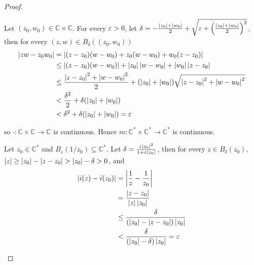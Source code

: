 \begin{proof}
\begin{enumerate}[label={(\alph*)}]
              Let $(z_{0}, w_{0})\in \mathbb{C}\times\mathbb{C}$. For every $\varepsilon > 0$, let $\delta = -\frac{\left\vert{z_{0}}\right\vert + \left\vert{w_{0}}\right\vert}{2} + \sqrt{\varepsilon + {\left(\frac{\left\vert{z_{0}}\right\vert + \left\vert{w_{0}}\right\vert}{2}\right)}^{2}}$, then for every $(z, w)\in B_{\delta}((z_{0}, w_{0}))$
              \begin{align*}
                  \left\vert{zw - z_{0}w_{0}}\right\vert & = \left\vert{(z - z_{0})(w - w_{0}) + z_{0}(w - w_{0}) + w_{0}(z - z_{0})}\right\vert                                                                   \\
                                        & \leq \left\vert{(z - z_{0})(w - w_{0})}\right\vert + \left\vert{z_{0}}\right\vert\left\vert{w - w_{0}}\right\vert + \left\vert{w_{0}}\right\vert\left\vert{z - z_{0}}\right\vert                                            \\
                                        & \leq \frac{\left\vert{z - z_{0}}\right\vert^{2} + \left\vert{w - w_{0}}\right\vert^{2}}{2} + (\left\vert{z_{0}}\right\vert + \left\vert{w_{0}}\right\vert)\sqrt{\left\vert{z - z_{0}}\right\vert^{2} + \left\vert{w - w_{0}}\right\vert^{2}} \\
                                        & < \frac{\delta^{2}}{2} + \delta(\left\vert{z_{0}}\right\vert + \left\vert{w_{0}}\right\vert)                                                                             \\
                                        & < \delta^{2} + \delta(\left\vert{z_{0}}\right\vert + \left\vert{w_{0}}\right\vert) = \varepsilon
              \end{align*}

              so $\cdot: \mathbb{C}\times\mathbb{C}\to\mathbb{C}$ is continuous. Hence $m: \mathbb{C}^{*}\times\mathbb{C}^{*}\to \mathbb{C}^{*}$ is continuous.

              Let $z_{0}\in\mathbb{C}^{*}$ and $B_{\varepsilon}(1/z_{0})\subseteq \mathbb{C}^{*}$. Let $\delta = \frac{\varepsilon\left\vert{z_{0}}\right\vert^{2}}{1 + \varepsilon\left\vert{z_{0}}\right\vert}$, then for every $z\in B_{\delta}(z_{0})$, $\left\vert{z}\right\vert\geq \left\vert{z_{0}}\right\vert - \left\vert{z - z_{0}}\right\vert > \left\vert{z_{0}}\right\vert - \delta > 0$, and
              \begin{align*}
                  \left\vert{i(z) - i(z_{0})}\right\vert & = \left\vert{\frac{1}{z} - \frac{1}{z_{0}}}\right\vert                            \\
                                        & = \frac{\left\vert{z - z_{0}}\right\vert}{\left\vert{z}\right\vert\left\vert{z_{0}}\right\vert}                     \\
                                        & \leq \frac{\delta}{(\left\vert{z_{0}}\right\vert - \left\vert{z - z_{0}}\right\vert)\left\vert{z_{0}}\right\vert}   \\
                                        & < \frac{\delta}{(\left\vert{z_{0}}\right\vert - \delta)\left\vert{z_{0}}\right\vert} = \varepsilon
              \end{align*}


\end{enumerate}
\end{proof}
